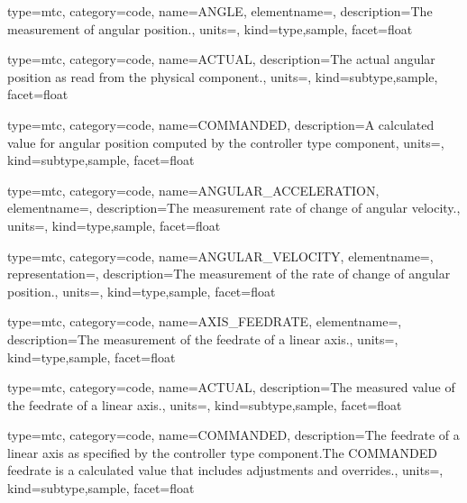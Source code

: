 {
  type=mtc,
  category=code,
  name={ANGLE},
  elementname=,
  description={The measurement of angular position.},
  units=,
  kind={type,sample},
  facet={\gls{float}}
}


{
  type=mtc,
  category=code,
  name={ACTUAL},
  description={The actual angular position as read from the physical component.},
  units=,
  kind={subtype,sample},
  facet={\gls{float}}
}


{
  type=mtc,
  category=code,
  name={COMMANDED},
  description={A calculated value for angular position computed by the \gls{controller} type component},
  units=,
  kind={subtype,sample},
  facet={\gls{float}}
}


{
  type=mtc,
  category=code,
  name={ANGULAR\_ACCELERATION},
  elementname=,
  description={The measurement rate of change of angular velocity.},
  units=,
  kind={type,sample},
  facet={\gls{float}}
}


{
  type=mtc,
  category=code,
  name={ANGULAR\_VELOCITY},
  elementname=,
  representation=,
  description={The measurement of the rate of change of angular position.},
  units=,
  kind={type,sample},
  facet={\gls{float}}
}


{
  type=mtc,
  category=code,
  name={AXIS\_FEEDRATE},
  elementname=,
  description={The measurement of the feedrate of a linear axis.},
  units=,
  kind={type,sample},
  facet={\gls{float}}
}


{
  type=mtc,
  category=code,
  name={ACTUAL},
  description={The measured value of the feedrate of a linear axis.},
  units=,
  kind={subtype,sample},
  facet={\gls{float}}
}


{
  type=mtc,
  category=code,
  name={COMMANDED},
  description={The feedrate of a linear axis as specified by the \gls{controller} type component.The COMMANDED feedrate is a calculated value that includes adjustments and overrides.},
  units=,
  kind={subtype,sample},
  facet={\gls{float}}
}


